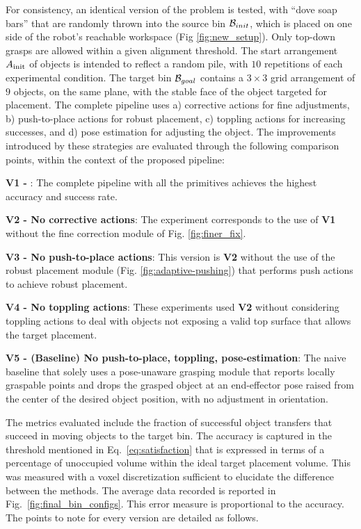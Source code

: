 For consistency, an identical version of the problem is tested, with ``dove soap bars'' that are randomly thrown into the source bin $\mathcal{B}_{init}$, which is placed on one side of the robot's reachable workspace (Fig \ref{fig:new_setup}). Only top-down grasps are allowed within a given alignment threshold. The start arrangement $A_{\rm init}$ of objects is intended to reflect a random pile, with $10$ repetitions of each experimental condition. The target bin $\mathcal{B}_{goal}$ contains a $3\times 3$ grid arrangement of $9$ objects, on the same plane, with the stable face of the object targeted for placement. The complete pipeline uses a) corrective actions for fine adjustments, b) push-to-place actions for robust placement, c) toppling actions for increasing successes, and d) pose estimation for adjusting the object. The improvements introduced by these strategies are evaluated through the following comparison points, within the context of the proposed pipeline: 

\noindent \textbf{V1 - }: The complete pipeline with all the primitives achieves the highest accuracy and success rate.

\noindent \textbf{V2 - No corrective actions}: The experiment corresponds to the use of \textbf{V1} without the fine correction module of Fig. \ref{fig:finer_fix}.

\noindent \textbf{V3 - No push-to-place actions}: This version is \textbf{V2} without the use of the robust placement module (Fig. \ref{fig:adaptive-pushing}) that performs push actions to achieve robust placement.

\noindent  \textbf{V4 - No toppling actions}: These experiments used \textbf{V2} without considering toppling actions to deal with objects not exposing a valid top surface that allows the target placement. 

\noindent  \textbf{V5 - (Baseline) No push-to-place, toppling, pose-estimation}: The naive baseline that solely uses a pose-unaware grasping module that reports locally graspable points and drops the grasped object at an end-effector pose raised from the center of the desired object position, with no adjustment in orientation. 

The metrics evaluated include the fraction of successful object transfers that succeed in moving objects to the target bin. The accuracy is captured in the threshold mentioned in Eq.~\eqref{eq:satisfaction} that is expressed in terms of a percentage of unoccupied volume within the ideal target placement volume. This was measured with a voxel discretization sufficient to elucidate the difference between the methods. The average data recorded is reported in Fig.~\ref{fig:final_bin_configs}. This error measure is proportional to the accuracy. The points to note for every version are detailed as follows.

